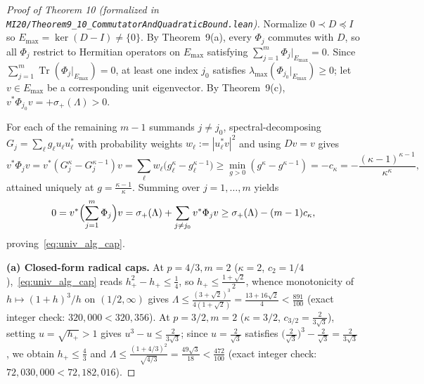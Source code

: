 \documentclass[10pt,letterpaper]{article}
\newcommand{\Tr}{\operatorname{Tr}}
\begin{document}
\begin{proof}[Proof of Theorem 10 (formalized in \texttt{MI20/Theorem9\_10\_\allowbreak CommutatorAndQuadraticBound.lean})]
Normalize $0 \prec D \preceq I$ so $E_{\max} = \ker(D - I) \neq \{0\}$. By Theorem~9(a), every $\Phi_j$ commutes with $D$, so all $\Phi_j$ restrict to Hermitian operators on $E_{\max}$ satisfying $\sum_{j=1}^m \Phi_j|_{E_{\max}} = 0$. Since $\sum_{j=1}^m \Tr(\Phi_j|_{E_{\max}}) = 0$, at least one index $j_0$ satisfies $\lambda_{\max}(\Phi_{j_0}|_{E_{\max}}) \ge 0$; let $v \in E_{\max}$ be a corresponding unit eigenvector. By Theorem~9(c), $v^* \Phi_{j_0} v = +\sigma_+(\Lambda) > 0$.

For each of the remaining $m - 1$ summands $j \neq j_0$, spectral-decomposing $G_j = \sum_\ell g_\ell u_\ell u_\ell^*$ with probability weights $w_\ell := |u_\ell^* v|^2$ and using $Dv = v$ gives
\[
  v^* \Phi_j v = v^*(G_j^\kappa - G_j^{\kappa-1}) v = \sum_\ell w_\ell\bigl(g_\ell^\kappa - g_\ell^{\kappa-1}\bigr) \ge \min_{g > 0}(g^\kappa - g^{\kappa-1}) = -c_\kappa = -\frac{(\kappa-1)^{\kappa-1}}{\kappa^\kappa},
\]
attained uniquely at $g = \frac{\kappa-1}{\kappa}$. Summing over $j = 1,\dots,m$ yields
\[
  0 = v^*\Bigl(\sum_{j=1}^m \Phi_j\Bigr)v = \sigma_+(\Lambda) + \sum_{j \neq j_0} v^* \Phi_j v \ge \sigma_+(\Lambda) - (m - 1)c_\kappa,
\]
proving~\eqref{eq:univ_alg_cap}.

\textbf{(a) Closed-form radical caps.} At $p = 4/3, m = 2$ ($\kappa = 2$, $c_2 = 1/4$),~\eqref{eq:univ_alg_cap} reads $h_+^2 - h_+ \le \frac{1}{4}$, so $h_+ \le \frac{1+\sqrt{2}}{2}$, whence monotonicity of $h \mapsto (1+h)^3/h$ on $(1/2,\infty)$ gives $\Lambda \le \frac{(3+\sqrt{2})^3}{4(1+\sqrt{2})} = \frac{13 + 16\sqrt{2}}{4} < \frac{891}{100}$ (exact integer check: $320{,}000 < 320{,}356$). At $p = 3/2, m = 2$ ($\kappa = 3/2$, $c_{3/2} = \frac{2}{3\sqrt{3}}$), setting $u = \sqrt{h_+} > 1$ gives $u^3 - u \le \frac{2}{3\sqrt{3}}$; since $u = \frac{2}{\sqrt{3}}$ satisfies $\bigl(\frac{2}{\sqrt{3}}\bigr)^3 - \frac{2}{\sqrt{3}} = \frac{2}{3\sqrt{3}}$, we obtain $h_+ \le \frac{4}{3}$ and $\Lambda \le \frac{(1+4/3)^2}{\sqrt{4/3}} = \frac{49\sqrt{3}}{18} < \frac{472}{100}$ (exact integer check: $72{,}030{,}000 < 72{,}182{,}016$).


\end{proof}
\end{document}

